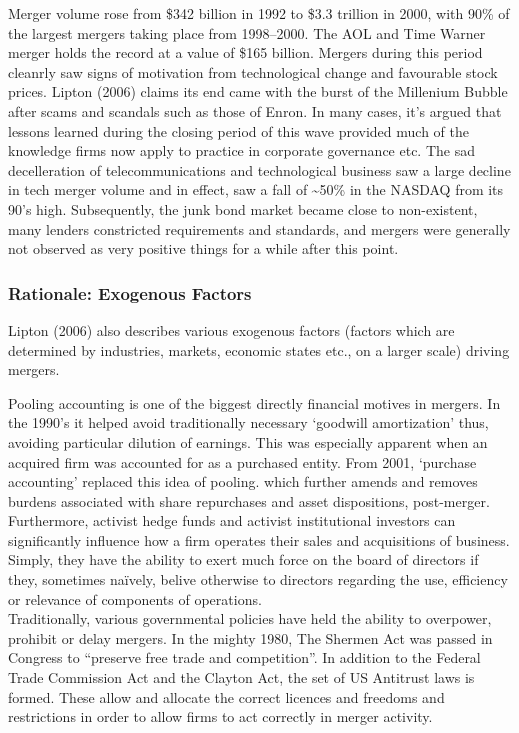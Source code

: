 \documentclass[11pt, english]{article}
\begin{document}
        Merger volume rose from \$342 billion in 1992 to \$3.3 trillion in 2000, with 90\% of the largest mergers taking place from 1998--2000. The AOL and Time Warner merger holds the record at a value of \$165 billion. Mergers during this period cleanrly saw signs of motivation from technological change and favourable stock prices. Lipton (2006) claims its end came with the burst of the Millenium Bubble after scams and scandals such as those of Enron. In many cases, it's argued that lessons learned during the closing period of this wave provided much of the knowledge firms now apply to practice in corporate governance etc. The sad decelleration of telecommunications and technological business saw a large decline in tech merger volume and in effect, saw a fall of \~{}50\% in the NASDAQ from its 90's high. Subsequently, the junk bond market became close to non-existent, many lenders constricted requirements and standards, and mergers were generally not observed as very positive things for a while after this point.

		\subsubsection*{Rationale: Exogenous Factors}

        Lipton (2006) also describes various exogenous factors (factors which are determined by industries, markets, economic states etc., on a larger scale) driving mergers.

        Pooling accounting is one of the biggest directly financial motives in mergers. In the 1990's it helped avoid traditionally necessary `goodwill amortization' thus, avoiding particular dilution of earnings. This was especially apparent when an acquired firm was accounted for as a purchased entity. From 2001, `purchase accounting' replaced this idea of pooling. which further amends and removes burdens associated with share repurchases and asset dispositions, post-merger.\\

        Furthermore, activist hedge funds and activist institutional investors can significantly influence how a firm operates their sales and acquisitions of business. Simply, they have the ability to exert much force on the board of directors if they, sometimes na\"{i}vely, belive otherwise to directors regarding the use, efficiency or relevance of components of operations.\\

        Traditionally, various governmental policies have held the ability to overpower, prohibit or delay mergers. In the mighty 1980, The Shermen Act was passed in Congress to ``preserve free trade and competition''. In addition to the Federal Trade Commission Act and the Clayton Act, the set of US Antitrust laws is formed. These allow and allocate the correct licences and freedoms and restrictions in order to allow firms to act correctly in merger activity.\\
\end{document}
